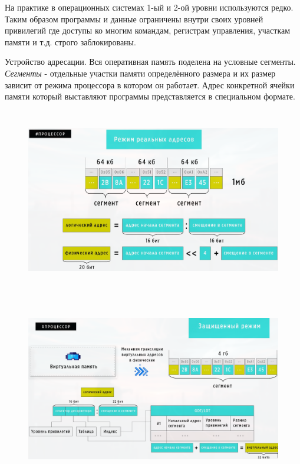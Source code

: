 	\par На практике в операционных системах 1-ый и 2-ой уровни используются редко. Таким образом программы и данные ограничены внутри своих уровней привилегий где доступы ко многим командам, регистрам управления, участкам памяти и т.д. строго заблокированы.
	
	\par Устройство адресации. Вся оперативная память поделена на условные сегменты. \textit{Сегменты} - отдельные участки памяти определённого размера и их размер зависит от режима процессора в котором он работает. Адрес конкретной ячейки памяти который выставляют программы представляется в специальном формате. 
	
	\begin{figure}[h]
		\centering
		\includegraphics[height=8cm]{img/2.6} 
		\captionsetup{font=footnotesize} 
		\caption*{} 
	\end{figure}
	
	\begin{figure}[h]
		\centering
		\includegraphics[height=8cm]{img/2.7} 
		\captionsetup{font=footnotesize} 
		\caption*{} 
	\end{figure}
	
